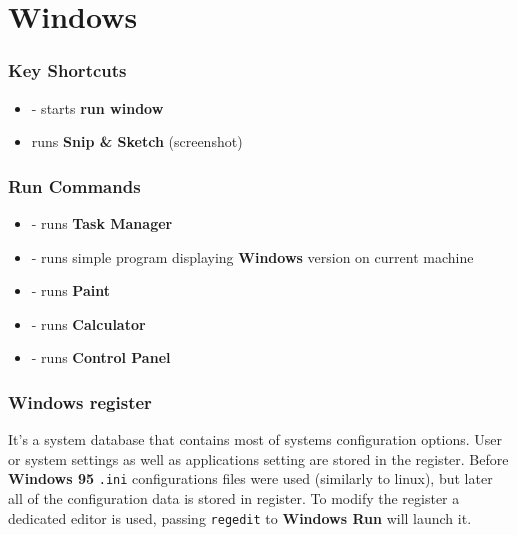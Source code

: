 \part{Windows}

\section{Key Shortcuts}
\begin{itemize}
\item {} - starts \textbf{run window}
\item {} runs \textbf{Snip \& Sketch} (screenshot)
\end{itemize}

\section{Run Commands}
\begin{itemize}
\item {} - runs \textbf{Task Manager}
\item {} - runs simple program displaying \textbf{Windows} version on current machine
\item {} - runs \textbf{Paint}
\item {} - runs \textbf{Calculator}
\item {} - runs \textbf{Control Panel}
\end{itemize}

\section{Windows register}

It's a system database that contains most of systems configuration options. User or system settings as well as applications setting are stored in the register. Before \textbf{Windows 95} \texttt{.ini} configurations files were used (similarly to linux), but later all of the configuration data is stored in register. To modify the register a dedicated editor is used, passing \texttt{regedit} to \textbf{Windows Run} will launch it.\\

\\

